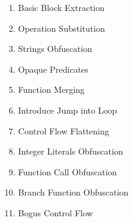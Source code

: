 \begin{enumerate}
  \setlength\itemsep{0.5pt} %
  \item Basic Block Extraction
  \item Operation Substitution
  \item Strings Obfuscation
  \item Opaque Predicates
  \item Function Merging
  \item Introduce Jump into Loop
  \item Control Flow Flattening
  \item Integer Literals Obfuscation
  \item Function Call Obfuscation
  \item Branch Function Obfuscation
  \item Bogus Control Flow
\end{enumerate}

